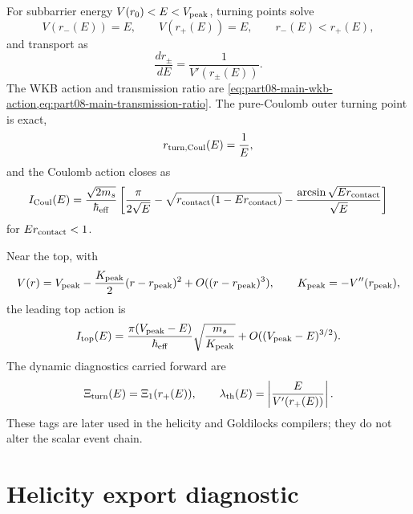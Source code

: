For subbarrier energy \(V(r_0)<E<V_{\rm peak}\), turning points solve
\begin{equation}
\label{eq:part08-stage248-turning-points}
V(r_-(E))=E,
\qquad
V(r_+(E))=E,
\qquad
r_-(E)<r_+(E),
\end{equation}
and transport as
\begin{equation}
\label{eq:part08-stage248-turning-transport}
\frac{dr_\pm}{dE}=\frac1{V'(r_\pm(E))}.
\end{equation}
The WKB action and transmission ratio are \cref{eq:part08-main-wkb-action,eq:part08-main-transmission-ratio}.  The pure-Coulomb outer turning point is exact,
\begin{equation}
\label{eq:part08-stage248-coul-turn}
r_{\rm turn,Coul}(E)=\frac1E,
\end{equation}
and the Coulomb action closes as
\begin{equation}
\label{eq:part08-stage248-coul-action}
I_{\rm Coul}(E)
=
\frac{\sqrt{2m_s}}{\hbar_{\rm eff}}
\left[
\frac{\pi}{2\sqrt E}
-
\sqrt{r_{\rm contact}(1-Er_{\rm contact})}
-
\frac{\arcsin\sqrt{Er_{\rm contact}}}{\sqrt E}
\right]
\end{equation}
for \(Er_{\rm contact}<1\).

Near the top, with
\begin{equation}
\label{eq:part08-stage248-near-top}
V(r)=V_{\rm peak}-\frac{K_{\rm peak}}2(r-r_{\rm peak})^2+O((r-r_{\rm peak})^3),
\qquad
K_{\rm peak}=-V''(r_{\rm peak}),
\end{equation}
the leading top action is
\begin{equation}
\label{eq:part08-stage248-top-action}
I_{\rm top}(E)=
\frac{\pi(V_{\rm peak}-E)}{\hbar_{\rm eff}}
\sqrt{\frac{m_s}{K_{\rm peak}}}
+O((V_{\rm peak}-E)^{3/2}).
\end{equation}
The dynamic diagnostics carried forward are
\begin{equation}
\label{eq:part08-stage248-diagnostics}
\Xi_{\rm turn}(E)=\Xi_1(r_+(E)),
\qquad
\lambda_{\rm th}(E)=\left|\frac{E}{V'(r_+(E))}\right|.
\end{equation}
These tags are later used in the helicity and Goldilocks compilers; they do not alter the scalar event chain.

\section{Helicity export diagnostic}
\label{sec:part08_relaxed_branch:helicity-export-diagnostic}

